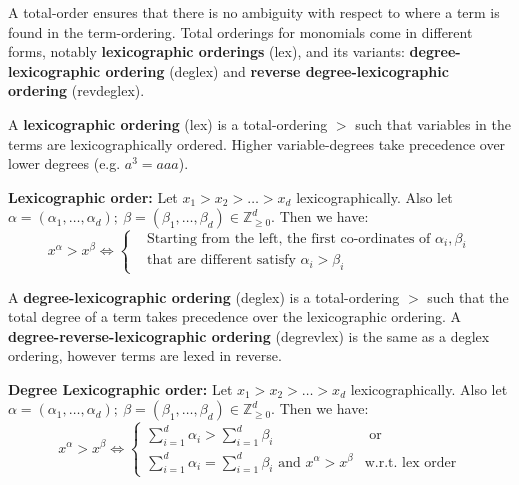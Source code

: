 A total-order ensures that there is no ambiguity with respect to where a term is found in 
the term-ordering.  Total orderings for monomials come in different forms, notably 
{\bf lexicographic orderings} (lex), and its variants: {\bf degree-lexicographic ordering} (deglex) 
and {\bf reverse degree-lexicographic ordering} (revdeglex).

A {\bf lexicographic ordering} (lex) is a total-ordering $>$ such that variables
in the terms are lexicographically ordered.  Higher variable-degrees take 
precedence over lower degrees (e.g. $a^3 = a a a$).
\begin{Definition}
{\bf Lexicographic order:} Let $x_1 > x_2 > \dots > x_d$
lexicographically. Also let $\alpha = (\alpha_1, \dots, \alpha_d);
~\beta = (\beta_1, \dots, \beta_d) \in \mathbb{Z}^d_{\geq 0}$. Then we
have: 
\begin{equation}
x^{\alpha} > x^{\beta} \iff 
\begin{cases}
& \text{Starting  from the  left, the first co-ordinates of $\alpha_i, \beta_i$} \\
& \text{that are different satisfy $\alpha_i > \beta_i$}

\end{cases}
\end{equation}
\end{Definition}

A {\bf degree-lexicographic ordering} (deglex) is a total-ordering $>$ such that 
the total degree of a term takes precedence over the lexicographic ordering.  A
{\bf degree-reverse-lexicographic ordering} (degrevlex) is the same as a
deglex ordering, however terms are lexed in reverse.

\begin{Definition}
{\bf Degree Lexicographic order:} Let $x_1 > x_2 > \dots > x_d$
lexicographically. Also let $\alpha = (\alpha_1, \dots, \alpha_d);
~\beta = (\beta_1, \dots, \beta_d) \in \mathbb{Z}^d_{\geq 0}$. Then we
have: 
\begin{equation}
x^{\alpha} > x^{\beta} \iff 
\begin{cases}
\sum_{i=1}^{d}\alpha_i > \sum_{i=1}^{d} \beta_i & \text{ or }\\
\sum_{i=1}^{d}\alpha_i = \sum_{i=1}^{d} \beta_i  \text{ and }
x^{\alpha} > x^{\beta} & \text{w.r.t. lex order}
\end{cases}
\end{equation}
\end{Definition}


